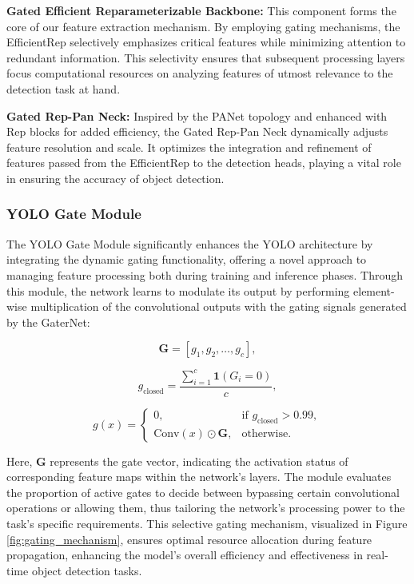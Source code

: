 \textbf{Gated Efficient Reparameterizable Backbone:} This component forms the core of our feature extraction mechanism. By employing gating mechanisms, the EfficientRep selectively emphasizes critical features while minimizing attention to redundant information. This selectivity ensures that subsequent processing layers focus computational resources on analyzing features of utmost relevance to the detection task at hand.

\textbf{Gated Rep-Pan Neck:} Inspired by the PANet topology and enhanced with Rep blocks for added efficiency, the Gated Rep-Pan Neck dynamically adjusts feature resolution and scale. It optimizes the integration and refinement of features passed from the EfficientRep to the detection heads, playing a vital role in ensuring the accuracy of object detection.

\subsubsection{YOLO Gate Module}
The YOLO Gate Module significantly enhances the YOLO architecture by integrating the dynamic gating functionality, offering a novel approach to managing feature processing both during training and inference phases. Through this module, the network learns to modulate its output by performing element-wise multiplication of the convolutional outputs with the gating signals generated by the GaterNet:

\begin{equation}
\mathbf{G} = [g_1, g_2, \ldots, g_c], \label{eq:G_vector}
\end{equation}

\begin{equation}
g_{\text{closed}} = \frac{\sum_{i=1}^{c} \mathbf{1}(G_i = 0)}{c}, \label{eq:g_closed}
\end{equation}

\begin{equation}
g(x) = 
\begin{cases} 
0, & \text{if } g_{\text{closed}} > 0.99, \\
\text{Conv}(x) \odot \mathbf{G}, & \text{otherwise}.
\end{cases} \label{eq:conditional_gating}
\end{equation}

Here, \(\mathbf{G}\) represents the gate vector, indicating the activation status of corresponding feature maps within the network's layers. The module evaluates the proportion of active gates to decide between bypassing certain convolutional operations or allowing them, thus tailoring the network's processing power to the task's specific requirements. This selective gating mechanism, visualized in Figure \ref{fig:gating_mechanism}, ensures optimal resource allocation during feature propagation, enhancing the model's overall efficiency and effectiveness in real-time object detection tasks.


